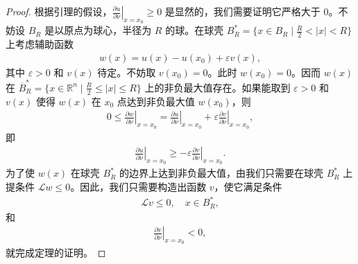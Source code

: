 \documentclass[../../main.tex]{subfiles}%
\begin{document}
\begin{proof}

根据引理的假设，$\left.\frac{\partial u}{\partial \nu}\right|_{x=x_0}\geqslant 0$ 是显然的，我们需要证明它严格大于 $0$。不妨设 $B_R$ 是以原点为球心，半径为 $R$ 的球。在球壳 $B_R^* = \{x\in B_R \mid \frac{R}{2}<|x|<R\}$ 上考虑辅助函数
\begin{align*}
w(x) = u(x) - u(x_0) + \varepsilon v(x),
\end{align*}
其中 $\varepsilon>0$ 和 $v(x)$ 待定。不妨取 $v(x_0)=0$。此时 $w(x_0)=0$。因而 $w(x)$ 在 $\overline{B}_R^*=\{x\in\mathbb{R}^n \mid \frac{R}{2}\leqslant |x|\leqslant R\}$ 上的非负最大值存在。如果能取到 $\varepsilon>0$ 和 $v(x)$ 使得 $w(x)$ 在 $x_0$ 点达到非负最大值 $w(x_0)$，则
\begin{align*}
0 \leqslant \left.\frac{\partial w}{\partial \nu}\right|_{x=x_0} = \left.\frac{\partial u}{\partial \nu}\right|_{x=x_0} + \varepsilon \left.\frac{\partial v}{\partial \nu}\right|_{x=x_0},
\end{align*}
即
\begin{align*}
\left.\frac{\partial u}{\partial \nu}\right|_{x=x_0} \geqslant -\varepsilon \left.\frac{\partial v}{\partial \nu}\right|_{x=x_0}.
\end{align*}
为了使 $w(x)$ 在球壳 $B_R^*$ 的边界上达到非负最大值，由我们只需要在球壳 $B_R^*$ 上提条件 $\mathcal{L}w\leqslant 0$。因此，我们只需要构造出函数 $v$，使它满足条件
\begin{align*}
\mathcal{L}v \leqslant 0,\quad x\in B_R^*,
\end{align*}
和
\begin{align*}
\left.\frac{\partial v}{\partial \nu}\right|_{x=x_0} < 0,
\end{align*}
就完成定理的证明。


\end{proof}
\end{document}
